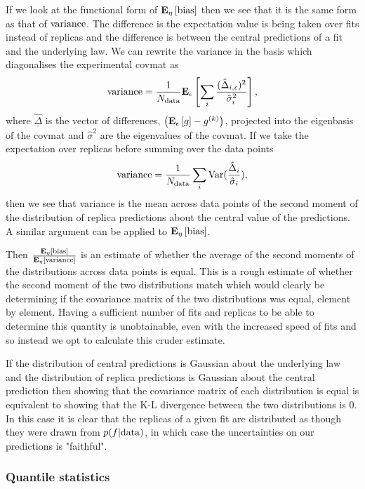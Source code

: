 If we look at the functional form of $\mathbf{E}_{\eta}\left[ {\rm bias} \right]$ then we see that it is
the same form as that of ${\rm variance}$. The difference is the expectation value is
being taken over fits instead of replicas and the difference is between the
central predictions of a fit and the underlying law. We can rewrite the variance
in the basis which diagonalises the experimental covmat as
\begin{equation}
    {\rm variance} = \frac{1}{N_{\rm data}} \mathbf{E}_{\epsilon}\left[  \sum_{i} \frac{(\hat{\Delta}_{i, \epsilon})^2}{\hat{\sigma}_{i}^2} \right],
\end{equation}
where $\underline{\hat{\Delta}}$ is the vector of differences, $\left( \mathbf{E}_{\epsilon}\left[ g \right] - g^{(k)}\right)$,
projected into the eigenbasis of the covmat and $\hat{\sigma}^2$ are the
eigenvalues of the covmat. If we take the expectation over replicas before
summing over the data points
\begin{equation}
    {\rm variance} = \frac{1}{N_{\rm data}} \sum_{i} {\rm Var}(\frac{\hat{\Delta}_i}{\hat{\sigma}_i}),
\end{equation}
then we see that variance is the mean across data points of the second moment
of the distribution of replica predictions about the central value of the predictions.
A similar argument can be applied to $\mathbf{E}_{\eta}\left[ {\rm bias} \right]$.

Then $\frac{\mathbf{E}_{\eta}\left[ {\rm bias} \right]}{\mathbf{E}_{\eta}\left[ {\rm variance} \right]}$ is an estimate of whether the average
of the second moments of the distributions across data points is equal. This
is a rough estimate of whether the second moment of the two distributions match
which would clearly be determining if the covariance matrix of the two distributions
was equal, element by element. Having a sufficient number of fits and replicas
to be able to determine this quantity is unobtainable, even with the increased
speed of fits and so instead we opt to calculate this cruder estimate.

If the distribution of central predictions is Gaussian about the underlying law
and the distribution of replica predictions is Gaussian about the central prediction
then showing that the covariance matrix of each distribution is equal is equivalent
to showing that the K-L divergence between the two distributions is 0. In this
case it is clear that the replicas of a given fit are distributed as though
they were drawn from $p(f|{\rm data})$, in which case the uncertainties on
our predictions is "faithful".

\subsubsection{Quantile statistics}

